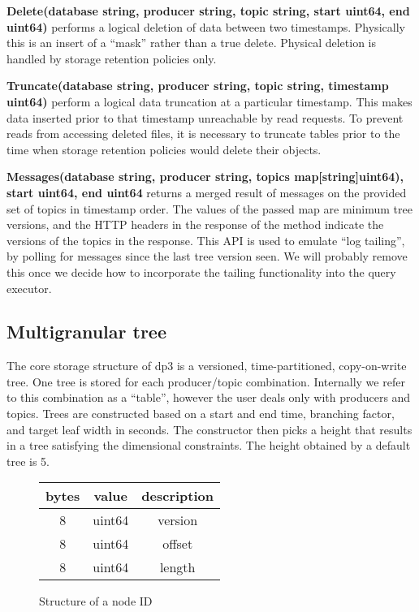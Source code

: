 \documentclass[9pt,twocolumn]{article}
\newcommand{\q}[1]{``#1''}
\begin{document}
    \textbf{Delete(database string, producer string, topic string, start uint64,
    end uint64)} performs a logical deletion of data between two timestamps.
    Physically this is an insert of a \q{mask} rather than a true delete.
    Physical deletion is handled by storage retention policies only.

    \textbf{Truncate(database string, producer string, topic string, timestamp
    uint64)} perform a logical data truncation at a particular timestamp. This
    makes data inserted prior to that timestamp unreachable by read requests. To
    prevent reads from accessing deleted files, it is necessary to truncate
    tables prior to the time when storage retention policies would delete their
    objects.

    \textbf{Messages(database string, producer string, topics
    map[string]uint64), start uint64, end uint64} returns a merged result of
    messages on the provided set of topics in timestamp order. The values of
    the passed map are minimum tree versions, and the HTTP headers in the
    response of the method indicate the versions of the topics in the response.
    This API is used to emulate \q{log tailing}, by polling for messages since
    the last tree version seen. We will probably remove this once we decide how
    to incorporate the tailing functionality into the query executor.

    \subsection{Multigranular tree} \label{tree}
    The core storage structure of dp3 is a versioned, time-partitioned,
    copy-on-write tree. One tree is stored for each producer/topic combination.
    Internally we refer to this combination as a \q{table}, however the user deals
    only with producers and topics. Trees are constructed based on a start and end
    time, branching factor, and target leaf width in seconds. The constructor then
    picks a height that results in a tree satisfying the dimensional constraints.
    The height obtained by a default tree is 5.

    \begin{figure}
      \begin{tabular}{ |c|c|c| }
        \hline
        bytes & value & description \\
        \hline
        8 & uint64 & version \\
        8 & uint64 & offset \\
        8 & uint64 & length \\
        \hline
      \end{tabular}
      \caption{Structure of a node ID}
      \label{nodeidstructure}
    \end{figure}
\end{document}
